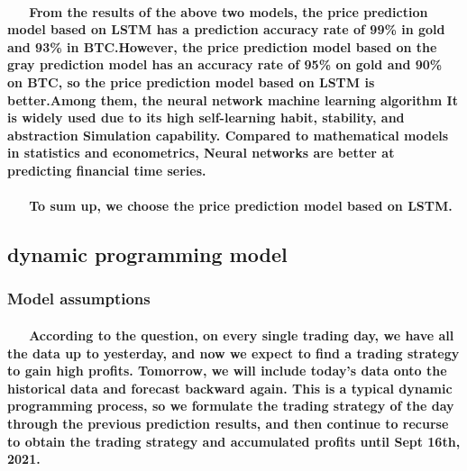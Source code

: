 \documentclass{mcmthesis}
\begin{document}
	\paragraph{
		\ \ \ From the results of the above two models, the price prediction model based on LSTM has a prediction accuracy rate of 99\% in gold and 93\% in BTC.However, the price prediction model based on the gray prediction model has an accuracy rate of 95\% on gold and 90\% on BTC, so the price prediction model based on LSTM is better.Among them, the neural network machine learning algorithm
		It is widely used due to its high self-learning habit, stability, and abstraction
		Simulation capability. Compared to mathematical models in statistics and econometrics,
		Neural networks are better at predicting financial time series.
	}
	
	
	
	\paragraph{
		\ \ \  To sum up, we choose the price prediction model based on LSTM.
	}
	
	\subsection{dynamic programming model}\cite{DTGH}
	
	\subsubsection{Model assumptions}
	
	
	
	
	\paragraph{
		\ \ \ According to the question, on every single trading day, we have all the data up to yesterday, and now we expect to find a trading strategy to gain high profits. Tomorrow, we will include today's data onto the historical data and forecast backward again. This is a typical dynamic programming process, so we formulate the trading strategy of the day through the previous prediction results, and then continue to recurse to obtain the trading strategy and accumulated profits until Sept 16th, 2021.
	}
	
\end{document}
